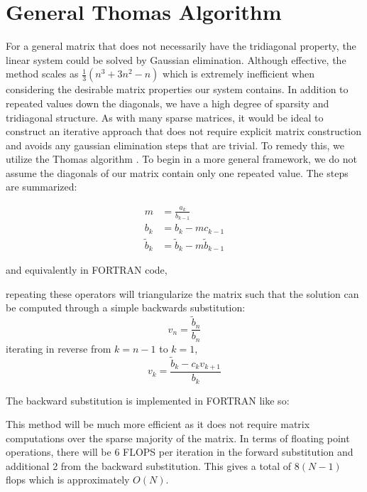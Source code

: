 \documentclass[10pt, a4paper]{amsart}
\begin{document}
\section{General Thomas Algorithm}
For a general matrix that does not necessarily have the tridiagonal property, the linear system could be solved by Gaussian elimination. Although effective, the method scales as $\frac{1}{3}(n^3+3n^2-n)$ which is extremely inefficient when considering the desirable matrix properties our system contains. In addition to repeated values down the diagonals, we have a high degree of sparsity and tridiagonal structure. As with many sparse matrices, it would be ideal to construct an iterative approach that does not require explicit matrix construction and avoids any gaussian elimination steps that are trivial. To remedy this, we utilize the Thomas algorithm \cite{recipes}. To begin in a more general framework, we do not assume the diagonals of our matrix contain only one repeated value. The steps are summarized:

\begin{align}
m &= \frac{a_k}{b_{k-1}}\\ 
b_k &= b_k-mc_{k-1}\\ 
\tilde{b}_k &= \tilde{b}_k-m\tilde{b}_{k-1}
\end{align}

and equivalently in FORTRAN code,


repeating these operators will triangularize the matrix such that the solution can be computed through a simple backwards substitution:
\begin{equation}
v_n = \frac{\tilde{b}_n}{b_n}
\end{equation}
iterating in reverse from $k = n-1$ to $k = 1$,
\begin{equation}
v_k = \frac{\tilde{b}_k-c_k v_{k+1}}{b_k} 
\end{equation}

The backward substitution is implemented in FORTRAN like so:


This method will be much more efficient as it does not require matrix computations over the sparse majority of the matrix. In terms of floating point operations, there will be 6 FLOPS per iteration in the forward substitution and additional 2 from the backward substitution. This gives a total of $8(N-1)$ flops which is approximately $O(N)$.
\end{document}
